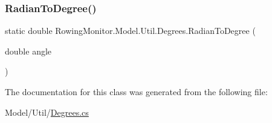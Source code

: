 \subsubsection{\texorpdfstring{Radian\+To\+Degree()}{RadianToDegree()}}
{\footnotesize\ttfamily static double Rowing\+Monitor.\+Model.\+Util.\+Degrees.\+Radian\+To\+Degree (\begin{DoxyParamCaption}\item[{double}]{angle }\end{DoxyParamCaption})\hspace{0.3cm}{\ttfamily [static]}}



The documentation for this class was generated from the following file\+:\begin{DoxyCompactItemize}
\item 
Model/\+Util/\hyperlink{_degrees_8cs}{Degrees.\+cs}\end{DoxyCompactItemize}
